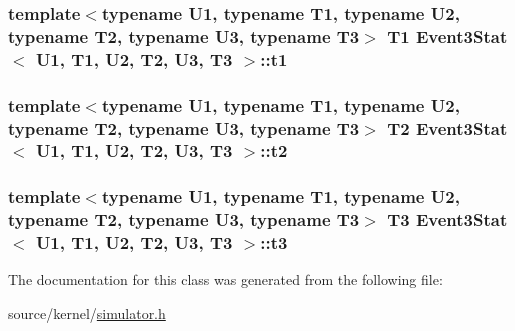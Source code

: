 \hypertarget{classEvent3Stat_9fec91fe7e92c4eba9a09defa58d5431}{
\subsubsection[{t1}]{\setlength{\rightskip}{0pt plus 5cm}template$<$typename U1, typename T1, typename U2, typename T2, typename U3, typename T3$>$ T1 {\bf Event3Stat}$<$ U1, T1, U2, T2, U3, T3 $>$::{\bf t1}}}
\label{classEvent3Stat_9fec91fe7e92c4eba9a09defa58d5431}


\hypertarget{classEvent3Stat_33217dc4cdc50f79c062e8e42cd7f5d2}{
\subsubsection[{t2}]{\setlength{\rightskip}{0pt plus 5cm}template$<$typename U1, typename T1, typename U2, typename T2, typename U3, typename T3$>$ T2 {\bf Event3Stat}$<$ U1, T1, U2, T2, U3, T3 $>$::{\bf t2}}}
\label{classEvent3Stat_33217dc4cdc50f79c062e8e42cd7f5d2}


\hypertarget{classEvent3Stat_046cd41d71f5aa91fbf6e509602ebe13}{
\subsubsection[{t3}]{\setlength{\rightskip}{0pt plus 5cm}template$<$typename U1, typename T1, typename U2, typename T2, typename U3, typename T3$>$ T3 {\bf Event3Stat}$<$ U1, T1, U2, T2, U3, T3 $>$::{\bf t3}}}
\label{classEvent3Stat_046cd41d71f5aa91fbf6e509602ebe13}




The documentation for this class was generated from the following file:\begin{CompactItemize}
\item 
source/kernel/\hyperlink{simulator_8h}{simulator.h}\end{CompactItemize}
